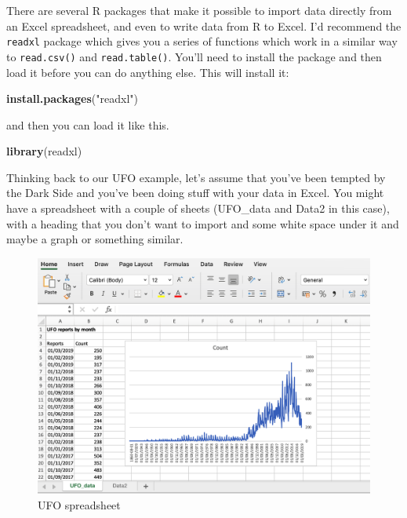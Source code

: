\documentclass[
]{book}
\newenvironment{Shaded}{\begin{snugshade}}{\end{snugshade}}
\newcommand{\KeywordTok}[1]{\textcolor[rgb]{0.13,0.29,0.53}{\textbf{#1}}}
\newcommand{\NormalTok}[1]{#1}
\newcommand{\StringTok}[1]{\textcolor[rgb]{0.31,0.60,0.02}{#1}}
\begin{document}
There are several R packages that make it possible to import data directly from an Excel spreadsheet, and even to write data from R to Excel. I'd recommend the \texttt{readxl} package which gives you a series of functions which work in a similar way to \texttt{read.csv()} and \texttt{read.table()}. You'll need to install the package and then load it before you can do anything else. This will install it:

\begin{Shaded}
\begin{Highlighting}[]
\KeywordTok{install.packages}\NormalTok{(}\StringTok{"readxl"}\NormalTok{)}
\end{Highlighting}
\end{Shaded}

and then you can load it like this.

\begin{Shaded}
\begin{Highlighting}[]
\KeywordTok{library}\NormalTok{(readxl)}
\end{Highlighting}
\end{Shaded}

Thinking back to our UFO example, let's assume that you've been tempted by the Dark Side and you've been doing stuff with your data in Excel. You might have a spreadsheet with a couple of sheets (UFO\_data and Data2 in this case), with a heading that you don't want to import and some white space under it and maybe a graph or something similar.

\begin{figure}
\centering
\includegraphics{Images/Excel_screenshot.png}
\caption{UFO spreadsheet}
\end{figure}
\end{document}
